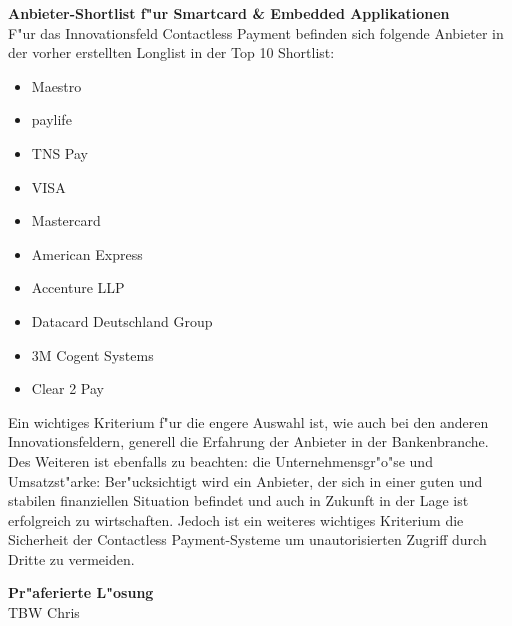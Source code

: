 \textbf{Anbieter-Shortlist f"ur Smartcard \& Embedded Applikationen}\\
F"ur das Innovationsfeld Contactless Payment befinden sich folgende Anbieter in der vorher erstellten Longlist in der Top 10 Shortlist:

\begin{itemize}
	\item Maestro
	\item paylife
	\item TNS Pay
	\item VISA
	\item Mastercard
	\item American Express
	\item Accenture LLP
	\item Datacard Deutschland Group
	\item 3M Cogent Systems
	\item Clear 2 Pay
\end{itemize}

Ein wichtiges Kriterium f"ur die engere Auswahl ist, wie auch bei den anderen Innovationsfeldern, generell die Erfahrung der Anbieter in der Bankenbranche. Des Weiteren ist ebenfalls zu beachten: die Unternehmensgr"o"se und Umsatzst"arke: Ber"ucksichtigt wird ein Anbieter, der sich in einer guten und stabilen finanziellen Situation befindet und auch in Zukunft in der Lage ist erfolgreich zu wirtschaften. Jedoch ist ein weiteres wichtiges Kriterium die Sicherheit der Contactless Payment-Systeme um unautorisierten Zugriff durch Dritte zu vermeiden. 

\textbf{Pr"aferierte L"osung}\\
TBW Chris\\
